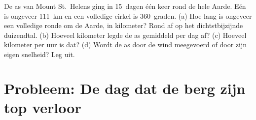 \begin{exercise}[$\star\star\star$]\label{exo:g7:volcanoes:12}
De as van Mount St.~Helens ging in 15~dagen één keer rond de hele Aarde.
Eén  is ongeveer \qty{111}{km} en een volledige cirkel is
360~graden. (a) Hoe lang is ongeveer een volledige ronde om de Aarde, in
kilometer? Rond af op het dichtstbijzijnde duizendtal. (b) Hoeveel
kilometer legde de as gemiddeld per dag af? (c) Hoeveel kilometer per uur
is dat? (d) Wordt de as door de wind meegevoerd of door zijn eigen
snelheid? Leg uit.
\end{exercise}

\section{Probleem: De dag dat de berg zijn top verloor}

